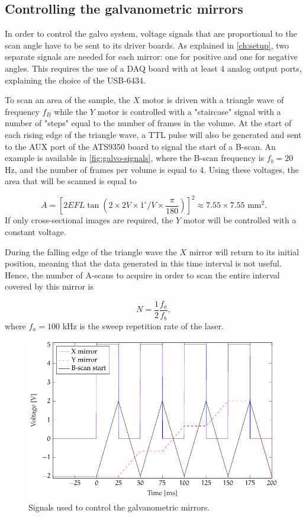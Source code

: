 \subsection{Controlling the galvanometric mirrors}
In order to control the galvo system, voltage signals that are proportional to the scan angle have to be sent to its driver boards. As explained in \autoref{ch:setup}, two separate signals are needed for each mirror: one for positive and one for negative angles. This requires the use of a \ac{DAQ} board with at least 4 analog output ports, explaining the choice of the USB-6434. 

To scan an area of the sample, the $X$ motor is driven with a triangle wave of frequency $f_B$ while the $Y$ motor is controlled with a "staircase" signal with a number of "steps" equal to the number of frames in the volume. At the start of each rising edge of the triangle wave, a TTL pulse will also be generated and sent to the AUX port of the ATS9350 board to signal the start of a B-scan. An example is available in \autoref{fig:galvo-signals}, where the B-scan frequency is $f_b = 20$ Hz, and the number of frames per volume is equal to 4. Using these voltages, the area that will be scanned is equal to 

\begin{equation}
	A = \left[2 EFL \tan\left( 2 \times 2 V \times 1  ^ \circ/V \times \frac{\pi}{180}\right)\right]^2 \approx 7.55\times 7.55 \text{ mm}^2.
\end{equation}
If only cross-sectional images are required, the $Y$ motor will be controlled with a constant voltage. 

During the falling edge of the triangle wave the $X$ mirror will return to its initial position, meaning that the data generated in this time interval is not useful. Hence, the number of A-scans to acquire in order to scan the entire interval covered by this mirror is

\begin{equation}\label{eq:bscan-maxwidth}
	N = \frac{1}{2} \frac{f_a}{f_b},
\end{equation}
where $f_a = 100$ kHz is the sweep repetition rate of the laser. 

\begin{figure}[htb]
	\myfloatalign
	\includegraphics[width=0.9\linewidth]{gfx/ch4/galvo-signals}
	\caption{Signals used to control the galvanometric mirrors.}\label{fig:galvo-signals}
\end{figure}

